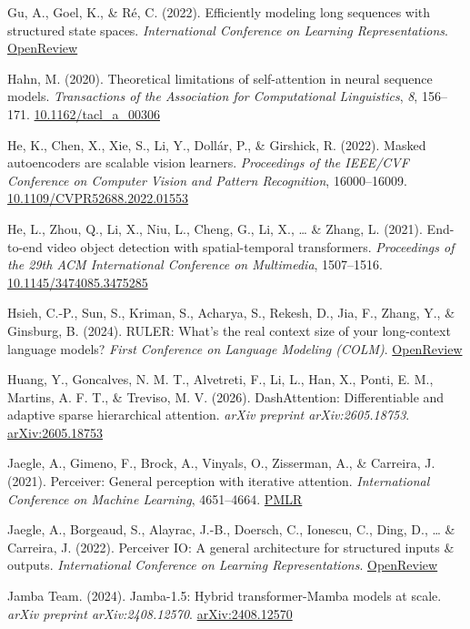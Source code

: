 \documentclass[10pt,twocolumn]{article}
\begin{document}
Gu, A., Goel, K., \& Ré, C. (2022). Efficiently modeling long sequences with structured state spaces. \emph{International Conference on Learning Representations}. \href{https://openreview.net/forum?id=uYLFoz1vlAC}{OpenReview}

Hahn, M. (2020). Theoretical limitations of self-attention in neural sequence models. \emph{Transactions of the Association for Computational Linguistics}, \emph{8}, 156--171. \href{https://doi.org/10.1162/tacl_a_00306}{10.1162/tacl\_a\_00306}

He, K., Chen, X., Xie, S., Li, Y., Dollár, P., \& Girshick, R. (2022). Masked autoencoders are scalable vision learners. \emph{Proceedings of the IEEE/CVF Conference on Computer Vision and Pattern Recognition}, 16000--16009. \href{https://doi.org/10.1109/CVPR52688.2022.01553}{10.1109/CVPR52688.2022.01553}

He, L., Zhou, Q., Li, X., Niu, L., Cheng, G., Li, X., \ldots{} \& Zhang, L. (2021). End-to-end video object detection with spatial-temporal transformers. \emph{Proceedings of the 29th ACM International Conference on Multimedia}, 1507--1516. \href{https://doi.org/10.1145/3474085.3475285}{10.1145/3474085.3475285}

Hsieh, C.-P., Sun, S., Kriman, S., Acharya, S., Rekesh, D., Jia, F., Zhang, Y., \& Ginsburg, B. (2024). RULER: What's the real context size of your long-context language models? \emph{First Conference on Language Modeling (COLM)}. \href{https://openreview.net/forum?id=kIoE4FFpQZ}{OpenReview}

Huang, Y., Goncalves, N. M. T., Alvetreti, F., Li, L., Han, X., Ponti, E. M., Martins, A. F. T., \& Treviso, M. V. (2026). DashAttention: Differentiable and adaptive sparse hierarchical attention. \emph{arXiv preprint arXiv:2605.18753}. \href{https://arxiv.org/abs/2605.18753}{arXiv:2605.18753}

Jaegle, A., Gimeno, F., Brock, A., Vinyals, O., Zisserman, A., \& Carreira, J. (2021). Perceiver: General perception with iterative attention. \emph{International Conference on Machine Learning}, 4651--4664. \href{https://proceedings.mlr.press/v139/jaegle21a.html}{PMLR}

Jaegle, A., Borgeaud, S., Alayrac, J.-B., Doersch, C., Ionescu, C., Ding, D., \ldots{} \& Carreira, J. (2022). Perceiver IO: A general architecture for structured inputs \& outputs. \emph{International Conference on Learning Representations}. \href{https://openreview.net/forum?id=fILj7WpI-g}{OpenReview}

Jamba Team. (2024). Jamba-1.5: Hybrid transformer-Mamba models at scale. \emph{arXiv preprint arXiv:2408.12570}. \href{https://arxiv.org/abs/2408.12570}{arXiv:2408.12570}
\end{document}
